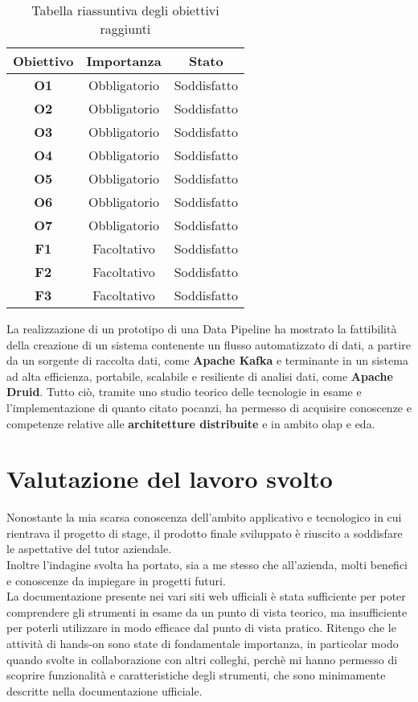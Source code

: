 \begin{table}[H]
    \centering
    \caption{Tabella riassuntiva degli obiettivi raggiunti}
    \label{tab:obiettivi_raggiunti}
    \begin{tabular}{|c|c|c|}
        \hline
        \textbf{Obiettivo} & \textbf{Importanza} & \textbf{Stato} \\\hline
        \textbf{O1} & Obbligatorio & Soddisfatto \\\hline
        \textbf{O2} & Obbligatorio & Soddisfatto\\\hline
        \textbf{O3} & Obbligatorio & Soddisfatto\\\hline
        \textbf{O4} & Obbligatorio & Soddisfatto \\ \hline
        \textbf{O5} & Obbligatorio & Soddisfatto \\\hline
        \textbf{O6} & Obbligatorio & Soddisfatto \\\hline
        \textbf{O7} & Obbligatorio & Soddisfatto \\\hline
        \textbf{F1} & Facoltativo & Soddisfatto\\\hline
        \textbf{F2} & Facoltativo & Soddisfatto \\\hline
        \textbf{F3} & Facoltativo & Soddisfatto\\\hline
    \end{tabular} 
\end{table}
\pagebreak
\noindent
La realizzazione di un prototipo di una \gls{Data Pipeline}{} ha mostrato la fattibilità della creazione di un sistema contenente un flusso automatizzato
di dati, a partire da un sorgente di raccolta dati, come \textbf{Apache Kafka} e terminante in un sistema ad alta efficienza, portabile, scalabile e resiliente di analisi dati, come \textbf{Apache Druid}.
Tutto ciò, tramite uno studio teorico delle tecnologie in esame e l'implementazione di quanto citato pocanzi, ha permesso di 
acquisire conoscenze e competenze relative alle \textbf{architetture distribuite} e in ambito \gls{olap}{} e \gls{eda}{}.  
\section{Valutazione del lavoro svolto}
Nonostante la mia scarsa conoscenza dell'ambito applicativo e tecnologico in cui rientrava il progetto di stage,
il prodotto finale sviluppato è riuscito a soddisfare le aspettative del tutor aziendale.\\
Inoltre l'indagine svolta 
ha portato, sia a me stesso che all'azienda,
 molti benefici e conoscenze da impiegare in progetti futuri.\\
La documentazione presente nei vari siti web ufficiali è stata sufficiente per poter comprendere gli strumenti in esame
da un punto di vista teorico, ma insufficiente 
per poterli utilizzare in modo efficace dal punto di vista pratico. Ritengo che 
le attività di \gls{hands-on}{} sono state di fondamentale importanza, in particolar modo 
quando svolte in collaborazione con altri colleghi, perchè mi hanno permesso di 
scoprire funzionalità e caratteristiche degli strumenti, che sono minimamente descritte nella documentazione ufficiale.\\
